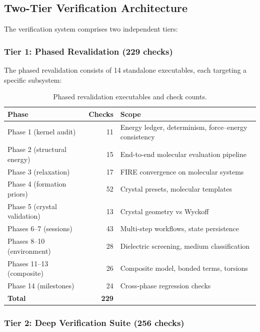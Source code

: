 \documentclass[11pt,twoside]{article}
\begin{document}
\subsection{Two-Tier Verification Architecture}

The verification system comprises two independent tiers:

\subsubsection{Tier 1: Phased Revalidation (229 checks)}

The phased revalidation consists of 14 standalone executables, each targeting a specific subsystem:

\begin{table}[H]
\centering
\caption{Phased revalidation executables and check counts.}
\label{tab:phase-executables}
\begin{tabular}{lrl}
\toprule
\textbf{Phase} & \textbf{Checks} & \textbf{Scope} \\
\midrule
Phase 1 (kernel audit)      & 11  & Energy ledger, determinism, force--energy consistency \\
Phase 2 (structural energy) & 15  & End-to-end molecular evaluation pipeline \\
Phase 3 (relaxation)        & 17  & FIRE convergence on molecular systems \\
Phase 4 (formation priors)  & 52  & Crystal presets, molecular templates \\
Phase 5 (crystal validation)& 13  & Crystal geometry vs Wyckoff \\
Phases 6--7 (sessions)      & 43  & Multi-step workflows, state persistence \\
Phases 8--10 (environment)  & 28  & Dielectric screening, medium classification \\
Phases 11--13 (composite)   & 26  & Composite model, bonded terms, torsions \\
Phase 14 (milestones)       & 24  & Cross-phase regression checks \\
\midrule
\textbf{Total}              & \textbf{229} & \\
\bottomrule
\end{tabular}
\end{table}

\subsubsection{Tier 2: Deep Verification Suite (256 checks)}
\end{document}
